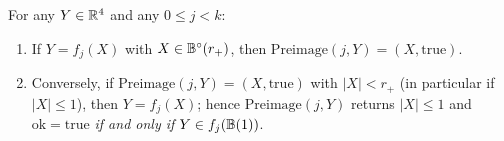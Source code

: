 

\begin{lemma}\label{lem:preimage-sound}
For any $Y\in\mathbb{R}^4$ and any $0\le j<k$:
\begin{enumerate}[label=(\roman*)]
\item If $Y=f_j(X)$ with $X\in\mathbb{B}^{\circ}(r_+)$, then $\mathrm{Preimage}(j,Y)=(X,\mathrm{true})$.
\item Conversely, if $\mathrm{Preimage}(j,Y)=(X,\mathrm{true})$ with $|X|<r_+$ (in particular if $|X|\le1$), then
$Y=f_j(X)$; hence $\mathrm{Preimage}(j,Y)$ returns $|X|\le1$ and $\mathrm{ok}=\mathrm{true}$ \emph{if and only if}
$Y\in f_j(\mathbb{B}(1))$.
\end{enumerate}
\end{lemma}


